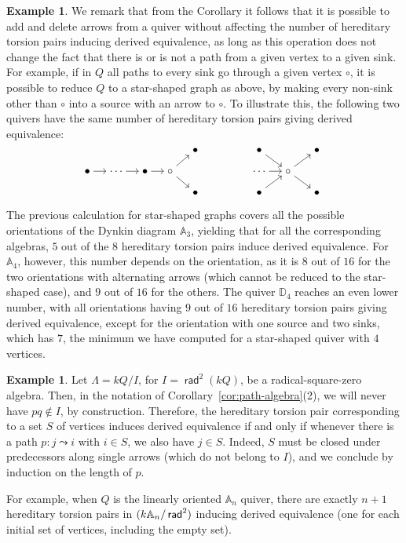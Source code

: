 \documentclass[a4paper,11pt]{amsart}
\theoremstyle{plain}
\theoremstyle{definition}
\newtheorem{ex}[thm]{Example}
\newcommand{\Abb}{\mathbb{A}} \renewcommand{\Bbb}{\mathbb{B}} \newcommand{\Cbb}{\mathbb{C}}
\newcommand{\Dbb}{\mathbb{D}} \newcommand{\Ebb}{\mathbb{E}} \newcommand{\Fbb}{\mathbb{F}}
\DeclareMathOperator{\rad}{\mathsf{rad}}
\let\mod\relax
\DeclareMathOperator{\mod}{\mathsf{mod}}
\begin{document}
\begin{ex}
	We remark that from the Corollary it follows that it is possible to add and
	delete arrows from a quiver without affecting the number of hereditary torsion
	pairs inducing derived equivalence, as long as this operation does not change
	the fact that there is or is not a path from a given vertex to a given sink.
	For example, if in $Q$ all paths to every sink go through a given vertex
	$\circ$, it is possible to reduce $Q$ to a star-shaped graph as above, by
	making every non-sink other than $\circ$ into a source with an arrow to
	$\circ$. To illustrate this, the following two quivers have the same number of
	hereditary torsion pairs giving derived equivalence:
	\[
		\begin{tikzcd}[sep=small,cramped]
		& & & & \bullet \\
		\bullet \ar{r} & \cdots \ar{r} & \bullet \ar{r} & \circ \ar{ur}\ar{dr}\\
		& & & & \bullet
	\end{tikzcd}
		\hspace{5em}
	\begin{tikzcd}[sep=small,cramped]
		\bullet \ar{dr} & & \bullet \\
		\cdots \ar{r} & \circ \ar{ur}\ar{dr} & \phantom{\cdots}\\
		\bullet \ar{ur} & & \bullet
	\end{tikzcd}
\]

	The previous calculation for star-shaped graphs covers all the
	possible orientations of the Dynkin diagram $\Abb_3$, yielding that for all the
	corresponding algebras, $5$ out of the $8$ hereditary torsion pairs induce
	derived equivalence. For $\Abb_4$, however, this number depends on the
	orientation, as it is $8$ out of $16$ for the two orientations with alternating
	arrows (which cannot be reduced to the star-shaped case), and $9$ out of $16$
	for the others. The quiver $\Dbb_4$ reaches an even lower number, with all
	orientations having $9$ out of $16$ hereditary
	torsion pairs giving derived equivalence, except for the orientation with one
	source and two sinks, which has $7$, the minimum we have computed for
	a star-shaped quiver with $4$ vertices.
\end{ex}

\begin{ex}
	Let $\Lambda=kQ/I$, for $I=\rad^2(kQ)$, be a radical-square-zero algebra. Then, in the
	notation of Corollary~\ref{cor:path-algebra}(2), we will never have $pq\notin
	I$, by construction. Therefore, the hereditary torsion pair corresponding to a
	set $S$ of vertices induces derived equivalence if and only if whenever there
	is a path $p\colon j\leadsto i$ with $i\in S$, we also have $j\in S$. Indeed, $S$ must
	be closed under predecessors along single arrows (which do not belong to $I$),
	and we conclude by induction on the length of $p$.

	For example, when $Q$ is the linearly oriented $\Abb_n$ quiver, there are
	exactly $n+1$ hereditary torsion pairs in $\mod(k\Abb_n/\rad^2)$ inducing
	derived equivalence (one for each initial set of vertices, including the empty
	set).
\end{ex}
\end{document}
